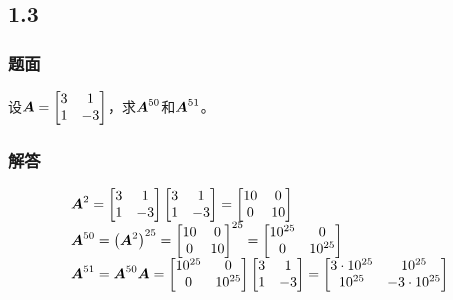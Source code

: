 \documentclass[9pt,xcolor=svgnames]{beamer} %
\begin{document}
\subsection*{1.3}
\begin{frame}
    \frametitle{题面}
    设\(\boldsymbol{A}=\begin{bmatrix}3&1\\1&-3\end{bmatrix}\)，求\(\boldsymbol{A}^{50}\)和\(\boldsymbol{A}^{51}\)。
\end{frame}
\begin{frame}
    \frametitle{解答}
    \begin{equation*}
        \begin{array}{lll}
            \boldsymbol{A}^2=\begin{bmatrix}3&1\\1&-3\end{bmatrix}\begin{bmatrix}3&1\\1&-3\end{bmatrix}=\begin{bmatrix}10&0\\0&10\end{bmatrix}     \\
            \boldsymbol{A}^{50}=\left( \boldsymbol{A}^2 \right)^{25}={\begin{bmatrix}10&0\\0&10\end{bmatrix}}^{25}=\begin{bmatrix}10^{25}&0\\0&10^{25}\end{bmatrix} \\
            \boldsymbol{A}^{51}=\boldsymbol{A}^{50}\boldsymbol{A}=\begin{bmatrix}10^{25}&0\\0&10^{25}\end{bmatrix}\begin{bmatrix}3&1\\1&-3\end{bmatrix}=\begin{bmatrix}3\cdot10^{25}&10^{25}\\10^{25}&-3\cdot10^{25}\end{bmatrix}
        \end{array}
    \end{equation*}
\end{frame}
\end{document}
